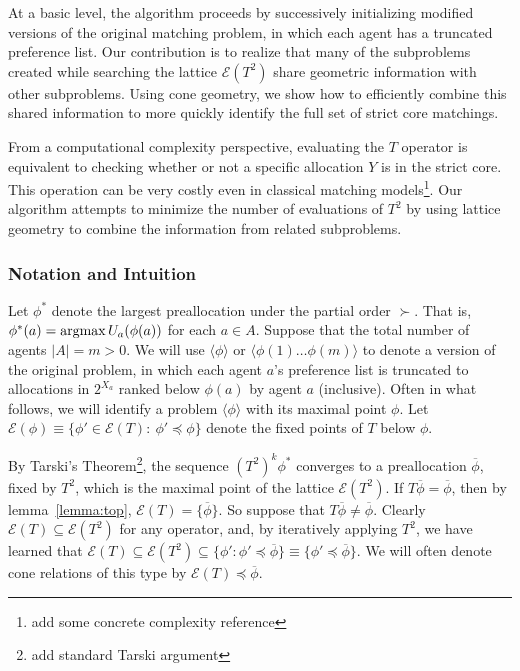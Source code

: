 \documentclass[11pt,reqno]{amsart}
\theoremstyle{definition}
\numberwithin{equation}{section}
\newcommand{\ol}{\overline}
\newcommand{\argmax}{\operatornamewithlimits{argmax}}
\newcommand{\lag}{\langle}
\newcommand{\rag}{\rangle}
\newcommand{\pre}{\phi}
\newcommand{\sub}{\subseteq}
\newcommand{\fix}{\mathcal{E}}
\newcommand{\peq}{\preceq}
\newcommand{\su}{\succ}
\newcommand{\toppre}{\ol{\pre}}
\begin{document}
At a basic level, the algorithm proceeds by successively initializing modified versions of the original matching problem, in which each agent has a truncated preference list.
Our contribution is to realize that many of the subproblems created while searching the lattice $\fix(T^2)$ share geometric information with other subproblems.
Using cone geometry, we show how to efficiently combine this shared information to more quickly identify the full set of strict core matchings. 

From a computational complexity perspective, evaluating the $T$ operator is equivalent to checking whether or not a specific allocation $Y$ is in the strict core.
This operation can be very costly even in classical matching models\footnote{add some concrete complexity reference}.
Our algorithm attempts to minimize the number of evaluations of $T^2$ by using lattice geometry to combine the information from related subproblems. 

\subsubsection{Notation and Intuition} \label{section:description1}
Let $\pre^*$ denote the largest preallocation under the partial order $\su$.
That is, $\pre^*(a) = \argmax U_a(\pre(a))$ for each $a \in A$.
Suppose that the total number of agents $|A| = m > 0$.
We will use $\langle \pre \rangle$ or $\langle \pre(1) \hdots \pre(m) \rangle$  to denote a version of the original problem, in which each agent $a$'s preference list is truncated to allocations in $2^{X_a}$ ranked below $\pre(a)$ by agent $a$ (inclusive). 
Often in what follows, we will identify a problem $\lag \pre \rag$ with its maximal point $\pre$.
Let $\fix(\pre) \equiv \{\pre' \in \fix(T): \: \pre' \peq \pre\}$ denote the fixed points of $T$ below $\pre$.  

By Tarski's Theorem\footnote{add standard Tarski argument}, the sequence $(T^2)^k \pre^*$ converges to a preallocation $\toppre$, fixed by $T^2$, which is the maximal point of the lattice $\fix(T^2)$.
If $T \toppre = \toppre$, then by lemma~\ref{lemma:top}, $\fix(T) = \{\toppre\}$.
So suppose that $T \toppre \not = \toppre$. 
Clearly $\fix(T) \sub \fix(T^2)$ for any operator, and, by iteratively applying $T^2$, we have learned that $\fix(T) \sub \fix (T^2) \sub \{\pre': \pre' \peq \toppre\} \equiv \{\pre' \peq \toppre\}$. We will often denote cone relations of this type by $\fix(T) \peq \toppre$. 
\end{document}
